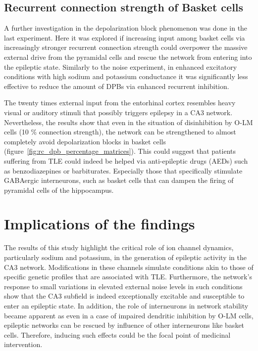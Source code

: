 \subsection{Recurrent connection strength of Basket cells}
A further investigation in the depolarization block phenomenon was done in the last experiment.
Here it was explored if increasing input among basket cells via increasingly stronger recurrent connection strength
could overpower the massive external drive from the pyramidal cells and rescue the network from entering into the epileptic state.
Similarly to the noise experiment, in enhanced excitatory conditions with high sodium and potassium conductance it was significantly less effective to reduce
the amount of DPBs via enhanced recurrent inhibition.

The twenty times external input from the entorhinal cortex resembles heavy visual or auditory stimuli that possibly triggers
epilepsy in a CA3 network. Nevertheless, the results show that even in the situation of disinhibition by O-LM cells (10 \% connection strength),
the network can be strengthened to almost completely avoid depolarization blocks in basket cells (figure~\ref{fig:rc_dpb_percentage_matrices}).
This could suggest that patients suffering from TLE could indeed be helped via anti-epileptic drugs (AEDs) such as benzodiazepines or barbiturates.
Especially those that specifically stimulate GABAergic interneurons, such as basket cells that can dampen the firing of pyramidal cells of the hippocampus.

\section{Implications of the findings}
The results of this study highlight the critical role of ion channel dynamics, particularly sodium and potassium, in the generation of epileptic activity in the CA3 network.
Modifications in these channels simulate conditions akin to those of specific genetic profiles that are associated with TLE\@.
Furthermore, the network's response to small variations in elevated external noise levels in such conditions show that the CA3 subfield is indeed exceptionally
excitable and susceptible to enter an epileptic state. In addition, the role of interneurons in network stability became apparent as
even in a case of impaired dendritic inhibition by O-LM cells, epileptic networks can be rescued by influence of other interneurons like basket cells.
Therefore, inducing such effects could be the focal point of medicinal intervention.

